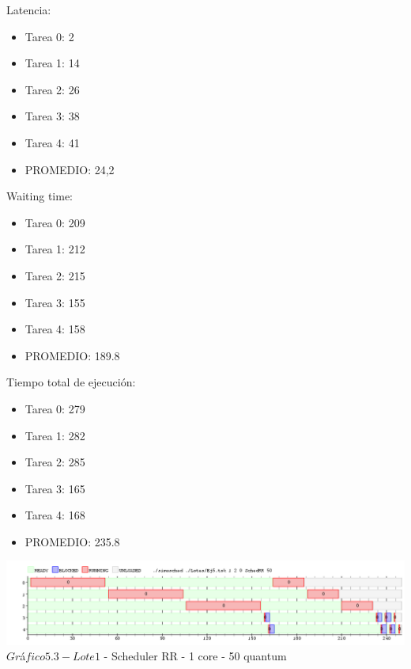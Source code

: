 \indent Latencia:\
\begin{itemize}
 \item Tarea 0: 2
 \item Tarea 1: 14
 \item Tarea 2: 26
 \item Tarea 3: 38
 \item Tarea 4: 41
 \item PROMEDIO: 24,2
\end{itemize}
\indent Waiting time:\
\begin{itemize}
 \item Tarea 0: 209
 \item Tarea 1: 212
 \item Tarea 2: 215
 \item Tarea 3: 155
 \item Tarea 4: 158
 \item PROMEDIO: 189.8
\end{itemize}
\indent Tiempo total de ejecuci\'{o}n:\
\begin{itemize}
 \item Tarea 0: 279
 \item Tarea 1: 282
 \item Tarea 2: 285
 \item Tarea 3: 165
 \item Tarea 4: 168
 \item PROMEDIO: 235.8
\end{itemize}

\begin{center}
  	\includegraphics[width=450pt]{ej5quantum50.png}
	  {$Gr$\'a$fico 5.3 - Lote 1$ - Scheduler RR - 1 core - 50 quantum}	
\end{center}

